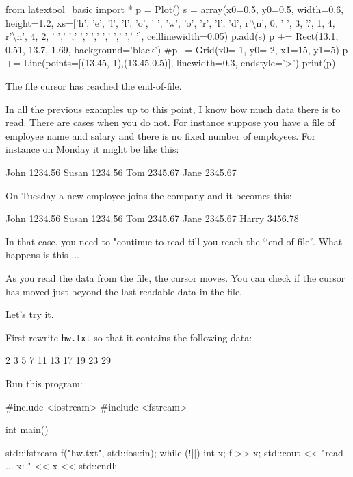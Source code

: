 \begin{consolethree}[escapeinside=||]
\begin{python}
from latextool_basic import *
p = Plot()
s = array(x0=0.5, y0=0.5, width=0.6, height=1.2, xs=['h', 'e', 'l', 'l', 'o', ' ', 'w', 'o', 'r', 'l', 'd', r'\textbackslash n', 0, ' ', 3, '.', 1, 4, r'\textbackslash  n', 4, 2, ' ',' ',' ',' ',' ',' ',' ',' '], celllinewidth=0.05)
p.add(s)
p += Rect(13.1, 0.51, 13.7, 1.69, background='black')
#p+= Grid(x0=-1, y0=-2, x1=15, y1=5)
p += Line(points=[(13.45,-1),(13.45,0.5)], linewidth=0.3, endstyle='>')
print(p)
\end{python}

The file cursor has reached the end-of-file.

\newpage{}

In all the previous examples up to this point, I know how much data
there is to read. There are cases when you do not. For instance suppose
you have a file of employee name and salary and there is no fixed number
of employees. For instance on Monday it might be like this:

\begin{console}
John 1234.56
Susan 1234.56
Tom 2345.67
Jane 2345.67
\end{console}

On Tuesday a new employee joins the company and it becomes this:

\begin{console}
John 1234.56
Susan 1234.56
Tom 2345.67
Jane 2345.67
Harry 3456.78
\end{console}

In that case, you need to "continue to read till you reach the \lq\lq end-of-file''. What happens is this ...

As you read the data from the file, the cursor moves. You can check if the cursor has moved just beyond the last readable data in the file.

Let's try it.

First rewrite \texttt{hw.txt} so that it contains the following data:

\begin{console}
2 3 5 7
11
13
17
19
23
29
\end{console}

Run this program:

\begin{consolethree}[escapeinside=||]
#include <iostream>
#include <fstream>

int main()
{   
    std::ifstream f("hw.txt", std::ios::in);    
    while (!||)
    {     
         int x;
         f >> x;
         std::cout << "read ... x: " << x
                   << std::endl;
    }

}
\end{consolethree}
\end{consolethree}
